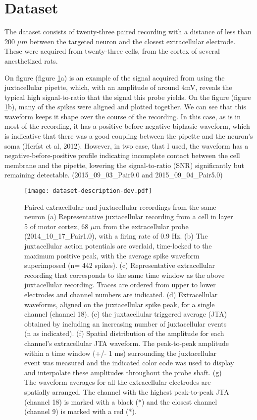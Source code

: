 \documentclass{report}
\begin{document}
\section{Dataset}
\label{sec:Netodataset}
The dataset consists of twenty-three paired recording with a distance of less than 200 $\mu m$ between the targeted neuron and the closest extracellular electrode. These were acquired from twenty-three cells, from the cortex of several anesthetized rats.

On figure (figure \ref{fig:neto-data-description}a) is an example of the signal acquired from using the juxtacellular pipette, which, with an amplitude of around 4mV, reveals the typical high signal-to-ratio that the signal this probe yields. On the figure (figure \ref{fig:neto-data-description}b), many of the spikes were aligned and  plotted together. We can see that this waveform keeps it shape over the course of the recording. In this case, as is in most of the recording, it has a positive-before-negative biphasic waveform, which is indicative that there was a good coupling between the pipette and the neuron's soma (Herfst et al, 2012). However, in two case, that I used, the waveform has a negative-before-positive profile indicating incomplete contact between the cell membrane and the pipette, lowering the signal-to-ratio (SNR) significantly but remaining detectable. (2015\_09\_03\_Pair9.0 and 2015\_09\_04\_Pair5.0)

\begin{figure}[!h]
	\centering
	\texttt{[image: dataset-description-dev.pdf]}
	\caption{Paired extracellular and juxtacellular recordings from the same neuron
(a) Representative juxtacellular recording from a cell in layer 5 of motor cortex, 68 $\mu m$ from the extracellular probe (2014\_10\_17\_Pair1.0), with a firing rate of 0.9 Hz. (b) The juxtacellular action potentials are overlaid, time-locked to the maximum positive peak, with the average spike waveform superimposed (n= 442 spikes). (c) Representative extracellular recording that corresponds to the same time window as the above juxtacellular recording. Traces are ordered from upper to lower electrodes and channel numbers are indicated. (d) Extracellular waveforms, aligned on the juxtacellular spike peak, for a single channel (channel 18). (e) the juxtacellular triggered average (JTA) obtained by including an increasing number of juxtacellular events (n as indicated). (f) Spatial distribution of the amplitude for each channel’s extracellular JTA waveform. The peak-to-peak amplitude within a time window (+/- 1 ms) surrounding the juxtacellular event was measured and the indicated color code was used to display and interpolate these amplitudes throughout the probe shaft. (g) The waveform averages for all the extracellular electrodes are spatially arranged. The channel with the highest peak-to-peak JTA (channel 18) is marked with a black (*) and the closest channel (channel 9) is marked with a red (*).
}
\label{fig:neto-data-description}
\end{figure}
\end{document}
